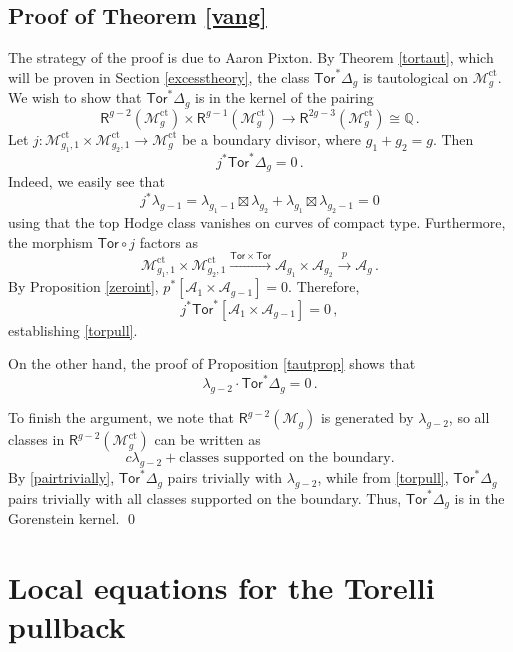 \documentclass[11pt]{amsart}
\theoremstyle{definition}
\newcommand{\R}{\mathsf{R}}
\newcommand{\M}{\mathcal{M}}
\newcommand{\A}{\mathcal{A}}
\DeclareMathOperator{\ct}{ct}
\newcommand{\Tor}{\mathsf{Tor}}
\begin{document}
{\subsection{Proof of Theorem \ref{vang}} The strategy of the
proof is due to Aaron Pixton. By Theorem \ref{tortaut}, which will be proven in Section \ref{excesstheory}, the class $\Tor^*\Delta_g$ is tautological on $\M_g^{\ct}$. We wish to show that $\Tor^*\Delta_g$ is in the kernel of the pairing $$\R^{g-2}(\M_g^{\ct})\times \R^{g-1}(\M_g^{\ct})\to \R^{2g-3}(\M_g^{\ct})\cong \mathbb Q\,.$$ 
Let $j:\M_{g_1, 1}^{\ct}\times \M_{g_2, 1}^{\ct}\to \M_g^{\ct}$ be a boundary divisor, where $g_1+g_2=g$. Then \begin{equation}\label{torpull}j^*\Tor^*\Delta_g=0\,.\end{equation} Indeed, we easily see that $$j^* \lambda_{g-1}=\lambda_{g_1-1}\boxtimes \lambda_{g_2}+\lambda_{g_1}\boxtimes \lambda_{g_2-1}=0$$ using that the top Hodge class vanishes on curves of compact type. Furthermore, the morphism $\Tor\circ j$ factors as $$\M_{g_1, 1}^{\ct}\times \M_{g_2, 1}^{\ct}\stackrel{\Tor\times \Tor}{\longrightarrow} \A_{g_1}\times \A_{g_2}\stackrel{p}{\to} \A_g\,.$$ By Proposition \ref{zeroint}, $p^* [\A_1\times \A_{g-1}]=0.$ Therefore,  
$$j^*\Tor^*[\A_1\times \A_{g-1}]=0\,,$$ establishing \eqref{torpull}. 

On the other hand, the proof of Proposition \ref{tautprop} shows that \begin{equation}\label{pairtrivially}\lambda_{g-2}\cdot \Tor^*\Delta_g=0\,.\end{equation}


To finish the argument, we note that $\R^{g-2}(\M_g)$ is generated by $\lambda_{g-2}$, so all classes in $\R^{g-2}(\M_g^{\ct})$ can be written as $$c \lambda_{g-2}+\text{classes supported on the boundary}.$$ By \eqref{pairtrivially},   $\Tor^*\Delta_g$ pairs trivially with $\lambda_{g-2}$, while from \eqref{torpull}, $\Tor^*\Delta_g$ pairs trivially with all classes supported on the boundary. Thus, $\Tor^*\Delta_g$ is in the Gorenstein kernel. 
\qed

\section{Local equations for the Torelli pullback}\label{tpullbacks}
}
\end{document}
